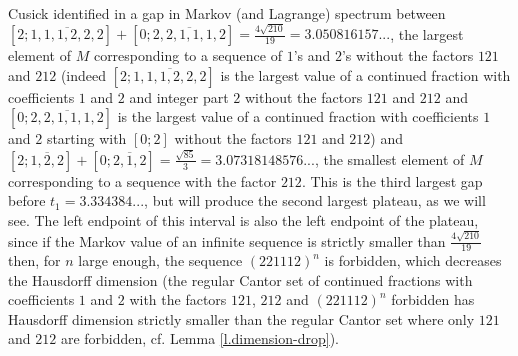 \documentclass[10pt]{amsart}
\numberwithin{equation}{section}
\theoremstyle{definition}
\begin{document}
Cusick identified in \cite{C74} a gap in Markov (and Lagrange) spectrum between $[2; \overline{1,1,1,2,2,2}]+[0; \overline{2,2,1,1,1,2}]=\frac{4\sqrt{210}}{19}=3.050816157...$, the largest element of $M$ corresponding to a sequence of $1$'s and $2$'s without the factors $121$ and $212$ (indeed $[2; \overline{1,1,1,2,2,2}]$ is the largest value of a continued fraction with coefficients $1$ and $2$ and integer part $2$ without the factors $121$ and $212$ and $[0; \overline{2,2,1,1,1,2}]$ is the largest value of a continued fraction with coefficients $1$ and $2$ starting with $[0;2]$ without the factors $121$ and $212$) and $[2; \overline{1,2,2}]+[0;\overline{2,1,2}]=\frac{\sqrt{85}}3=3.07318148576...$, the smallest element of $M$ corresponding to a sequence with the factor $212$. This is the third largest gap before $t_1=3.334384...$, but will produce the second largest plateau, as we will see. The left endpoint of this interval is also the left endpoint of the plateau, since if the Markov value of an infinite sequence is strictly smaller than $\frac{4\sqrt{210}}{19}$ then, for $n$ large enough, the sequence $(221112)^n$ is forbidden, which decreases the Hausdorff dimension (the regular Cantor set of continued fractions with coefficients $1$ and $2$ with the factors $121$, $212$ and $(221112)^n$ forbidden has Hausdorff dimension strictly smaller than the regular Cantor set where only $121$ and $212$ are forbidden, cf. Lemma \ref{l.dimension-drop}). 
\end{document}
